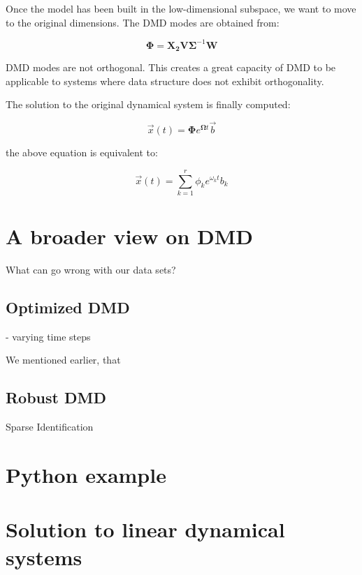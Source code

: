 \documentclass[10pt,twocolumn]{article}
\begin{document}
Once the model has been built in the low-dimensional subspace, we want to move to the original dimensions. The DMD modes are obtained from:

\begin{equation} \label{eq:A_underline}
\bm{\Phi} = \bm{X_2} \bm{V} \bm{\Sigma}^{-1} \bm{W}
\end{equation}

DMD modes are not orthogonal. This creates a great capacity of DMD to be applicable to systems where data structure does not exhibit orthogonality.

The solution to the original dynamical system is finally computed:

\begin{equation} \label{eq:x-solution-matrix}
\vec{x}(t) = \bm{\Phi} e^{\bm{\Omega} t} \vec{b}
\end{equation}

the above equation is equivalent to:

\begin{equation} \label{eq:x-solution-summation}
\vec{x}(t)  = \sum_{k=1}^{r} \phi_k e^{\omega_k t} b_k
\end{equation}

\section{A broader view on DMD} \label{sec:view}

What can go wrong with our data sets?

\subsection{Optimized DMD}

- varying time steps

We mentioned earlier, that 

\subsection{Robust DMD}



Sparse Identification


\section{Python example}



\appendix

\section{Solution to linear dynamical systems} \label{app:A}
\end{document}
